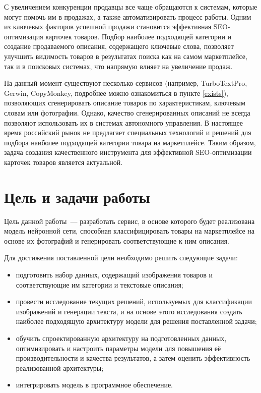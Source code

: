 \documentclass[a4paper,12pt]{extarticle}
\begin{document}
С увеличением конкуренции продавцы все чаще обращаются к системам, которые могут помочь им в продажах, а также автоматизировать процесс работы. Одним из ключевых факторов успешной продажи становится эффективная SEO-оптимизация карточек товаров. Подбор наиболее подходящей категории и создание продаваемого описания, содержащего ключевые слова, позволяет улучшить видимость товаров в результатах поиска как на самом маркетплейсе, так и в поисковых системах, что напрямую влияет на увеличение продаж.

На данный момент существуют несколько сервисов (например, TurboTextPro, Gerwin, CopyMonkey, подробнее можно ознакомиться в пункте \ref{exists}), позволяющих сгенерировать описание товаров по характеристикам, ключевым словам или фотографии. Однако, качество сгенерированных описаний не всегда позволяют использовать их в системах автономного управления. В настоящее время российский рынок не предлагает специальных технологий и решений для подбора наиболее подходящей категории товара на маркетплейсе. Таким образом, задача создания качественного инструмента для эффективной SEO-оптимизации карточек товаров является актуальной. 


\newpage
\section{Цель и задачи работы}

Цель данной работы — разработать сервис, в основе которого будет реализована модель нейронной сети, способная классифицировать товары на маркетплейсе на основе их фотографий и генерировать соответствующие к ним описания.

Для достижения поставленной цели необходимо решить следующие задачи:
\begin{itemize}
	\item подготовить набор данных, содержащий изображения товаров и соответствующие им категории и текстовые описания;
	\item провести исследование текущих решений, используемых для классификации изображений и генерации текста, и на основе этого исследования создать наиболее подходящую архитектуру модели для решения поставленной задачи;
	\item обучить спроектированную архитектуру на подготовленных данных, оптимизировать и настроить параметры модели для повышения её производительности и качества результатов, а затем оценить эффективность реализованной архитектуры;
	\item интегрировать модель в программное обеспечение.
\end{itemize}
\end{document}

